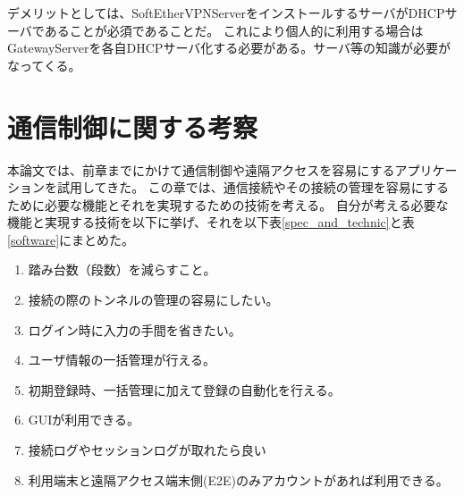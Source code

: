 \documentclass[11pt,a4j,titlepage]{jreport}
\begin{document}
デメリットとしては、SoftEtherVPNServerをインストールするサーバがDHCPサーバであることが必須であることだ。
これにより個人的に利用する場合はGatewayServerを各自DHCPサーバ化する必要がある。サーバ等の知識が必要がなってくる。





\chapter{通信制御に関する考察}

本論文では、前章までにかけて通信制御や遠隔アクセスを容易にするアプリケーションを試用してきた。
この章では、通信接続やその接続の管理を容易にするために必要な機能とそれを実現するための技術を考える。
自分が考える必要な機能と実現する技術を以下に挙げ、それを以下表\ref{spec_and_technic}と表\ref{software}にまとめた。

\begin{enumerate}
    \setlength{\parskip}{0.1cm} %
    \setlength{\itemsep}{0.1cm} 
    \item 踏み台数（段数）を減らすこと。
    \item 接続の際のトンネルの管理の容易にしたい。%
    \item ログイン時に入力の手間を省きたい。%
    \item ユーザ情報の一括管理が行える。%
    \item 初期登録時、一括管理に加えて登録の自動化を行える。
    \item GUIが利用できる。
    \item 接続ログやセッションログが取れたら良い
    \item 利用端末と遠隔アクセス端末側(E2E)のみアカウントがあれば利用できる。%
\end{enumerate}
\end{document}

